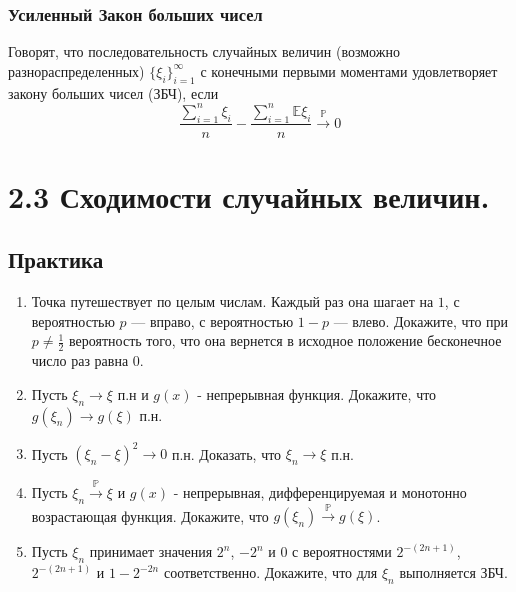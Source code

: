 \documentclass[a4paper, 14pt]{extarticle}
\begin{document}
\subsubsection*{Усиленный Закон больших чисел}
Говорят, что последовательность случайных величин (возможно разнораспределенных) $\{\xi_i\}_{i=1}^{\infty}$ с конечными первыми моментами удовлетворяет закону больших чисел (ЗБЧ), если
$$\frac{\sum_{i=1}^n\xi_i}{n} - \frac{\sum_{i=1}^n\mathbb{E}\xi_i}{n} \overset{\mathbb{P}}{\to} 0$$
	
	  
\newpage
\section*{2.3 Сходимости случайных величин.}
\subsection*{Практика}
\begin{enumerate}

\item Точка путешествует по целым числам. Каждый раз она шагает на $1$, с вероятностью $p$ — вправо, с вероятностью $1-p$ — влево. 
Докажите, что при $p \neq \frac{1}{2}$ вероятность того, что она вернется в исходное положение бесконечное число раз равна $0$.

\item Пусть $\xi_n \to \xi$ п.н и $g(x)$ - непрерывная функция. Докажите, что $g(\xi_n) \to g(\xi)$ п.н.

\item Пусть $(\xi_n - \xi)^2 \to 0$ п.н. Доказать, что $\xi_n \to \xi$ п.н.

\item Пусть $\xi_n \overset{\mathbb{P}}{\to} \xi$ и $g(x)$ - непрерывная, дифференцируемая и монотонно возрастающая функция. Докажите, что $g(\xi_n) \overset{\mathbb{P}}{\to} g(\xi)$.

\item Пусть $\xi_n$ принимает значения $2^n$, $- 2^n$ и $0$ с вероятностями $2^{-(2n+1)}$, $2^{-(2n+1)}$ и $1 - 2^{-2n}$ соответственно. 
Докажите, что для $\xi_n$ выполняется ЗБЧ.


\end{enumerate}
\newpage
\end{document}
